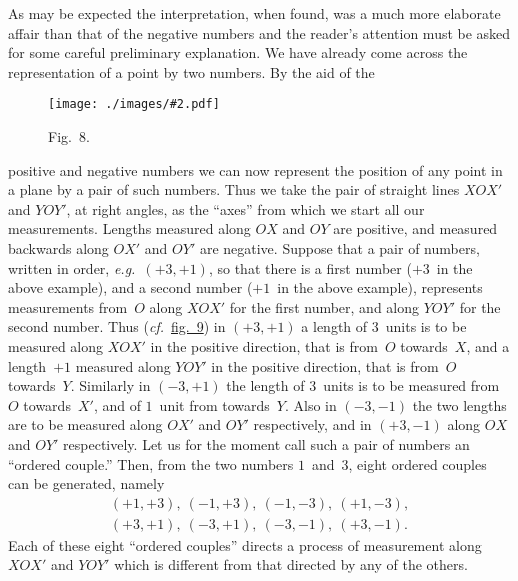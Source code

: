 \documentclass[12pt,leqno]{book}[2005/09/16]
\newcommand{\Chg}[2]{#2}
\newcommand{\Graphic}[2]{%
  \phantomsection\label{fig:#2}%
  \texttt{[image: ./images/\#2.pdf]}%
}
\newcommand{\DefWidth}{4in}%
\newcommand{\Figure}[2][\DefWidth]{%
  \begin{figure}[hbt!]
    \centering
    \phantomsection\label{fig:#2}
    \Graphic{#1}{fig#2}
    \caption{Fig.~#2.}
  \end{figure}\ignorespaces%
}
\newcommand{\Fig}[2][Fig.]{\hyperref[fig:#2]{#1~#2}}
\newcommand{\PageSep}[1]{\ignorespaces}
\newcommand{\cf}{\emph{cf.}}
\newcommand{\eg}{\emph{e.g.}}
\begin{document}
As may be expected the interpretation,
\PageSep{92}
when found, was a much more elaborate affair
than that of the negative numbers and the
reader's attention must be asked for some
careful preliminary explanation. We have
already come across the representation of a
point by two numbers. By the aid of the
\Figure{8}
positive and negative numbers we can now
represent the position of any point in a plane
by a pair of such numbers. Thus we take
the pair of straight lines $XOX'$ and $YOY'$, at
right angles, as the ``axes'' from which we
start all our measurements. Lengths measured
along $OX$ and $OY$ are positive, and
measured backwards along $OX'$ and $OY'$ are
negative. Suppose that a pair of numbers,
written in order, \eg~$(+3, +1)$, so that there
\PageSep{93}
%
is a first number ($+3$~in the above example),
and a second number ($+1$~in the above example),
represents measurements from~$O$
along $XOX'$ for the first number, and along
$YOY'$ for the second number. Thus (\Chg{cf.}{\cf}\ \Fig[fig.]{9}) in
$(+3, +1)$ a length of $3$~units is to be measured
along $XOX'$ in the positive direction, that
is from~$O$ towards~$X$, and a length~$+1$
measured along $YOY'$ in the positive direction,
that is from~$O$ towards~$Y$. Similarly in
$(-3, +1)$ the length of $3$~units is to be
measured from~$O$ towards~$X'$, and of $1$~unit
from towards~$Y$. Also in $(-3, -1)$ the
two lengths are to be measured along $OX'$
and $OY'$ respectively, and in $(+3, -1)$ along
$OX$ and $OY'$ respectively. Let us for the
moment call such a pair of numbers an
``ordered couple.'' Then, from the two numbers
$1$~and~$3$, eight ordered couples can be
generated, namely
\begin{gather*}
(+1, +3),\ (-1, +3),\ (-1, -3),\ (+1, -3), \\
(+3, +1),\ (-3, +1),\ (-3, -1),\ (+3, -1).
\end{gather*}
Each of these eight ``ordered couples'' directs
a process of measurement along $XOX'$ and
$YOY'$ which is different from that directed
by any of the others.
\end{document}
